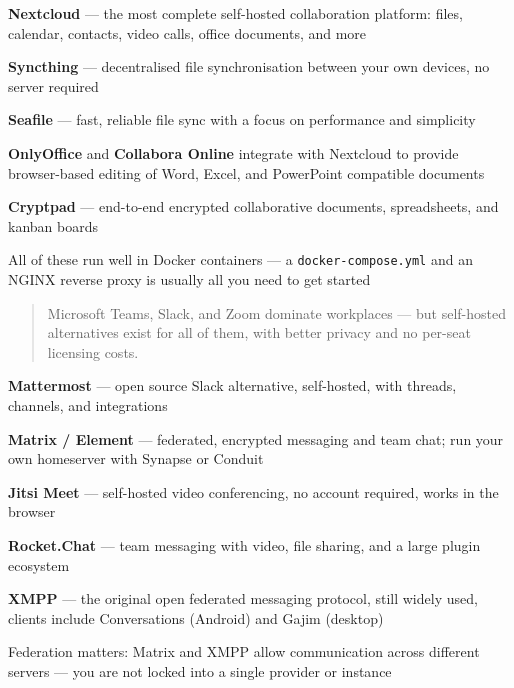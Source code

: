 \documentclass[Screen16to9,17pt]{foils}
\begin{document}
\begin{list2}
\item {\bf Nextcloud} — the most complete self-hosted collaboration platform:
files, calendar, contacts, video calls, office documents, and more 
\item {\bf Syncthing} — decentralised file synchronisation between your own devices,
no server required 
\item {\bf Seafile} — fast, reliable file sync with a focus on performance and simplicity 
\item {\bf OnlyOffice} and {\bf Collabora Online} integrate with Nextcloud to provide
browser-based editing of Word, Excel, and PowerPoint compatible documents
\item {\bf Cryptpad} — end-to-end encrypted collaborative documents, spreadsheets,
and kanban boards 
\item All of these run well in Docker containers — a \verb+docker-compose.yml+ and
an NGINX reverse proxy is usually all you need to get started
\end{list2}




\begin{quote}
Microsoft Teams, Slack, and Zoom dominate workplaces —
but self-hosted alternatives exist for all of them,
with better privacy and no per-seat licensing costs.
\end{quote}

\begin{list2}
\item {\bf Mattermost} — open source Slack alternative, self-hosted,
with threads, channels, and integrations 
\item {\bf Matrix / Element} — federated, encrypted messaging and team chat;
run your own homeserver with Synapse or Conduit 
\item {\bf Jitsi Meet} — self-hosted video conferencing, no account required,
works in the browser 
\item {\bf Rocket.Chat} — team messaging with video, file sharing,
and a large plugin ecosystem 
\item {\bf XMPP} — the original open federated messaging protocol, still widely used,
clients include Conversations (Android) and Gajim (desktop)
\item Federation matters: Matrix and XMPP allow communication across different servers —
you are not locked into a single provider or instance
\end{list2}
\end{document}
